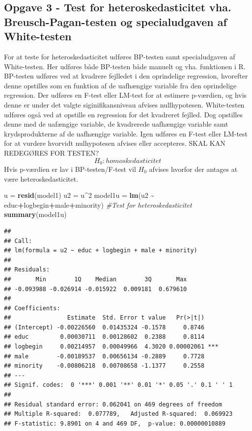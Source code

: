 \documentclass[
]{article}
\newenvironment{Shaded}{\begin{snugshade}}{\end{snugshade}}
\newcommand{\CommentTok}[1]{\textcolor[rgb]{0.56,0.35,0.01}{\textit{#1}}}
\newcommand{\DecValTok}[1]{\textcolor[rgb]{0.00,0.00,0.81}{#1}}
\newcommand{\FunctionTok}[1]{\textcolor[rgb]{0.13,0.29,0.53}{\textbf{#1}}}
\newcommand{\NormalTok}[1]{#1}
\newcommand{\OtherTok}[1]{\textcolor[rgb]{0.56,0.35,0.01}{#1}}
\newcommand{\SpecialCharTok}[1]{\textcolor[rgb]{0.81,0.36,0.00}{\textbf{#1}}}
\begin{document}
\hypertarget{opgave-3---test-for-heteroskedasticitet-vha.-breusch-pagan-testen-og-specialudgaven-af-white-testen}{%
\subsection{Opgave 3 - Test for heteroskedasticitet vha.
Breusch-Pagan-testen og specialudgaven af
White-testen}\label{opgave-3---test-for-heteroskedasticitet-vha.-breusch-pagan-testen-og-specialudgaven-af-white-testen}}

For at teste for heteroskedasticitet udføres BP-testen samt
specialudgaven af White-testen. Her udføres både BP-testen både manuelt
og vha. funktionen i R. BP-testen udføres ved at kvadrere fejlledet i
den oprindelige regression, hvorefter denne opstilles som en funktion af
de uafhængige variable fra den oprindelige regression. Der udføres en
F-test eller LM-test for at estimere p-værdien, og hvis denne er under
det valgte siginifikansniveau afvises nullhypotesen. White-testen
udføres også ved at opstille en regression for det kvadreret fejlled.
Dog opstilles denne med de uafængige variable, de kvadrerede uafhængige
variable samt krydsprodukterne af de uafhængige variable. Igen udføres
en F-test eller LM-test for at vurdere hvorvidt nulhypotesen afvises
eller accepteres. SKAL KAN REDEGØRES FOR TESTEN?
\[H_0: homoskedasticitet\] Hvis p-værdien er lav i BP-testen/F-test vil
\(H_0\) afvises hvorfor der antages at være heteroskedasticitet.

\begin{Shaded}
\begin{Highlighting}[]
\NormalTok{u }\OtherTok{=} \FunctionTok{resid}\NormalTok{(model1)}
\NormalTok{u2 }\OtherTok{=}\NormalTok{ u}\SpecialCharTok{\^{}}\DecValTok{2}
\NormalTok{model1u }\OtherTok{=} \FunctionTok{lm}\NormalTok{(u2 }\SpecialCharTok{\textasciitilde{}}\NormalTok{ educ}\SpecialCharTok{+}\NormalTok{logbegin}\SpecialCharTok{+}\NormalTok{male}\SpecialCharTok{+}\NormalTok{minority) }\CommentTok{\#Test for heteroskedasticitet}
\FunctionTok{summary}\NormalTok{(model1u)}
\end{Highlighting}
\end{Shaded}

\begin{verbatim}
## 
## Call:
## lm(formula = u2 ~ educ + logbegin + male + minority)
## 
## Residuals:
##       Min        1Q    Median        3Q       Max 
## -0.093988 -0.026914 -0.015922  0.009181  0.679610 
## 
## Coefficients:
##                Estimate  Std. Error t value   Pr(>|t|)    
## (Intercept) -0.00226560  0.01435324 -0.1578     0.8746    
## educ         0.00030711  0.00128602  0.2388     0.8114    
## logbegin     0.00214957  0.00049966  4.3020 0.00002061 ***
## male        -0.00189537  0.00656134 -0.2889     0.7728    
## minority    -0.00806218  0.00708658 -1.1377     0.2558    
## ---
## Signif. codes:  0 '***' 0.001 '**' 0.01 '*' 0.05 '.' 0.1 ' ' 1
## 
## Residual standard error: 0.062041 on 469 degrees of freedom
## Multiple R-squared:  0.077789,   Adjusted R-squared:  0.069923 
## F-statistic: 9.8901 on 4 and 469 DF,  p-value: 0.00000010889
\end{verbatim}
\end{document}
